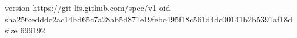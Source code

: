 version https://git-lfs.github.com/spec/v1
oid sha256:edddc2ac14bd65c7a28ab5d871e19febc495f18c561d4dc00141b2b5391af18d
size 699192

